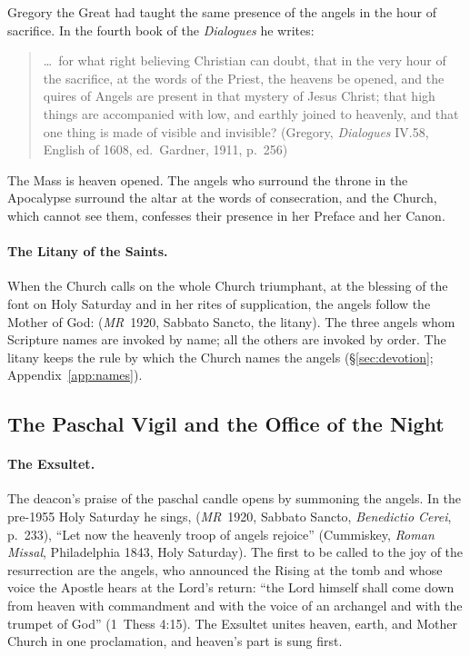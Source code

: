 Gregory the Great had taught the same presence of the angels in the hour
of sacrifice. In the fourth book of the \emph{Dialogues} he writes:
\begin{quote}
\dots\ for what right believing Christian can doubt, that in the very hour of
the sacrifice, at the words of the Priest, the heavens be opened, and the
quires of Angels are present in that mystery of Jesus Christ; that high
things are accompanied with low, and earthly joined to heavenly, and that
one thing is made of visible and invisible? (Gregory, \emph{Dialogues}
IV.58, English of 1608, ed.\ Gardner, 1911, p.~256)
\end{quote}
The Mass is heaven opened. The angels who surround the throne in the
Apocalypse surround the altar at the words of consecration, and the
Church, which cannot see them, confesses their presence in her Preface
and her Canon.

\paragraph{The Litany of the Saints.} When the Church calls on the whole
Church triumphant, at the blessing of the font on Holy Saturday and in
her rites of supplication, the angels follow the Mother of God:
 (\emph{MR}~1920, Sabbato Sancto, the litany).
The three angels whom Scripture names are invoked by name; all the others
are invoked by order. The litany keeps the rule by which the Church names
the angels (\S\ref{sec:devotion}; Appendix~\ref{app:names}).

\sectionguard
\subsection{The Paschal Vigil and the Office of the Night}

\paragraph{The Exsultet.} The deacon's praise of the paschal candle opens
by summoning the angels. In the pre-1955 Holy Saturday he sings,
 (\emph{MR}~1920,
Sabbato Sancto, \emph{Benedictio Cerei}, p.~233), ``Let now the heavenly
troop of angels rejoice'' (Cummiskey, \emph{Roman Missal}, Philadelphia
1843, Holy Saturday). The first to be called to the joy of the
resurrection are the angels, who announced the Rising at the tomb and
whose voice the Apostle hears at the Lord's return: ``the Lord himself
shall come down from heaven with commandment and with the voice of an
archangel and with the trumpet of God'' (1~Thess 4:15). The Exsultet
unites heaven, earth, and Mother Church in one proclamation, and heaven's
part is sung first.

